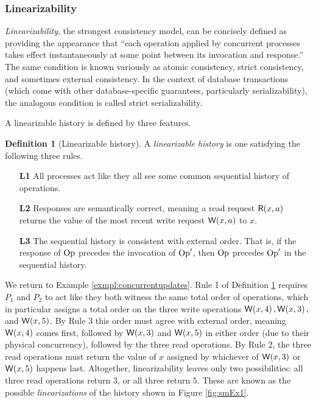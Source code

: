 \documentclass[]             %
{NASA}                       %
\theoremstyle{definition}
\newtheorem{definition}{Definition}[section]
\providecommand{\tightlist}{%
  \setlength{\itemsep}{0pt}\setlength{\parskip}{0pt}}
\begin{document}
\subsubsection{Linearizability}
\label{sssec:linearizability}

\emph{Linearizability}, the strongest consistency model, can be
concisely defined as providing the appearance that ``each operation
applied by concurrent processes takes effect instantaneously at some
point between its invocation and response.''
\cite{10.1145/78969.78972} The same condition is known variously as
atomic consistency, strict consistency, and sometimes external
consistency. In the context of database transactions (which come with
other database-specific guarantees, particularly serializability), the
analogous condition is called strict serializability.

A linearizable history is defined by three features.
\begin{definition}[Linearizable history]
  \label{def:linearizable}
  A \emph{linearizable history} is one satisfying the following three rules.
\begin{enumerate}
  \tightlist
\item[\textbf{L1}] All processes act like they all see some common sequential
  history of operations.
\item[\textbf{L2}] Responses are semantically correct, meaning a read request
  \(\mathsf{R}\!\left(x, a\right)\) returns the value of the most recent write request
  \(\mathsf{W}\!\left(x, a\right)\) to \(x\).
\item[\textbf{L3}] The sequential history is consistent with external
  order. That is, if the response of $\mathrm{Op}$ precedes the invocation of
  $\mathrm{Op}'$, then $\mathrm{Op}$ precedes $\mathrm{Op}'$ in the sequential history.
\end{enumerate}
\end{definition}

We return to Example \ref{exmpl:concurrentupdates}. Rule 1 of
Definition \ref{def:linearizable} requires $P_1$ and $P_2$ to act like
they both witness the same total order of operations, which in
particular assigns a total order on the three write operations
$\mathsf{W}\!\left(x, 4\right), \mathsf{W}\!\left(x, 3\right),$ and $\mathsf{W}\!\left(x, 5\right)$. By Rule 3
this order must agree with external order, meaning $\mathsf{W}\!\left(x, 4\right)$
comes first, followed by $\mathsf{W}\!\left(x, 3\right)$ and $\mathsf{W}\!\left(x, 5\right)$ in
either order (due to their physical concurrency), followed by the
three read operations. By Rule 2, the three read operations must
return the value of $x$ assigned by whichever of $\mathsf{W}\!\left(x, 3\right)$ or
$\mathsf{W}\!\left(x, 5\right)$ happens last. Altogether, linearizability leaves
only two possibilities: all three read operations return $3$, or all
three return $5$. These are known as the possible
\emph{linearizations} of the history shown in Figure \ref{fig:smEx1}.
\end{document}
